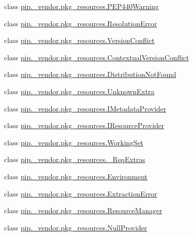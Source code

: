 \begin{DoxyCompactItemize}
\item 
class \hyperlink{classpip_1_1__vendor_1_1pkg__resources_1_1PEP440Warning}{pip.\+\_\+vendor.\+pkg\+\_\+resources.\+P\+E\+P440\+Warning}
\item 
class \hyperlink{classpip_1_1__vendor_1_1pkg__resources_1_1ResolutionError}{pip.\+\_\+vendor.\+pkg\+\_\+resources.\+Resolution\+Error}
\item 
class \hyperlink{classpip_1_1__vendor_1_1pkg__resources_1_1VersionConflict}{pip.\+\_\+vendor.\+pkg\+\_\+resources.\+Version\+Conflict}
\item 
class \hyperlink{classpip_1_1__vendor_1_1pkg__resources_1_1ContextualVersionConflict}{pip.\+\_\+vendor.\+pkg\+\_\+resources.\+Contextual\+Version\+Conflict}
\item 
class \hyperlink{classpip_1_1__vendor_1_1pkg__resources_1_1DistributionNotFound}{pip.\+\_\+vendor.\+pkg\+\_\+resources.\+Distribution\+Not\+Found}
\item 
class \hyperlink{classpip_1_1__vendor_1_1pkg__resources_1_1UnknownExtra}{pip.\+\_\+vendor.\+pkg\+\_\+resources.\+Unknown\+Extra}
\item 
class \hyperlink{classpip_1_1__vendor_1_1pkg__resources_1_1IMetadataProvider}{pip.\+\_\+vendor.\+pkg\+\_\+resources.\+I\+Metadata\+Provider}
\item 
class \hyperlink{classpip_1_1__vendor_1_1pkg__resources_1_1IResourceProvider}{pip.\+\_\+vendor.\+pkg\+\_\+resources.\+I\+Resource\+Provider}
\item 
class \hyperlink{classpip_1_1__vendor_1_1pkg__resources_1_1WorkingSet}{pip.\+\_\+vendor.\+pkg\+\_\+resources.\+Working\+Set}
\item 
class \hyperlink{classpip_1_1__vendor_1_1pkg__resources_1_1__ReqExtras}{pip.\+\_\+vendor.\+pkg\+\_\+resources.\+\_\+\+Req\+Extras}
\item 
class \hyperlink{classpip_1_1__vendor_1_1pkg__resources_1_1Environment}{pip.\+\_\+vendor.\+pkg\+\_\+resources.\+Environment}
\item 
class \hyperlink{classpip_1_1__vendor_1_1pkg__resources_1_1ExtractionError}{pip.\+\_\+vendor.\+pkg\+\_\+resources.\+Extraction\+Error}
\item 
class \hyperlink{classpip_1_1__vendor_1_1pkg__resources_1_1ResourceManager}{pip.\+\_\+vendor.\+pkg\+\_\+resources.\+Resource\+Manager}
\item 
class \hyperlink{classpip_1_1__vendor_1_1pkg__resources_1_1NullProvider}{pip.\+\_\+vendor.\+pkg\+\_\+resources.\+Null\+Provider}

\end{DoxyCompactItemize}
